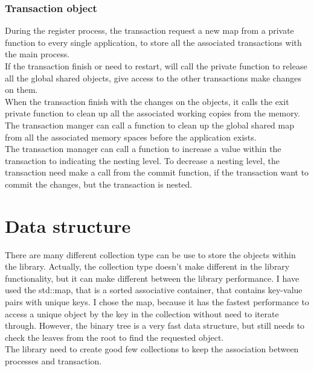 \documentclass[12pt]{article}
\begin{document}
\subsubsection{Transaction object}
During the register process, the transaction request a new map from a private function to every single application, to store all the associated transactions with the main process.\\
If the transaction finish or need to restart, will call the private function to release all the global shared objects, give access to the other transactions make changes on them.\\ 
When the transaction finish with the changes on the objects, it calls the exit private function to clean up all the associated working copies from the memory.\\

The transaction manger can  call a function to clean up the global shared map from all the associated memory spaces before the application exists.\\

The transaction manager can call a function to increase a value within the transaction to indicating the nesting level. To decrease a nesting level, the transaction need make a call from the commit function, if the transaction want to commit the changes, but the transaction is nested.

\section{Data structure}
There are many different collection type can be use to store the objects within the library. Actually, the collection type doesn't make different in the library functionality, but it can make different between the library performance. I have used the std::map, that is a sorted associative container, that contains key-value pairs with unique keys. I chose the map, because it has the fastest performance to access a unique object by the key in the collection without need to iterate through. However, the binary tree is a very fast data structure, but still needs to check the leaves from the root to find the requested object.\\

The library need to create good few collections to keep the association between processes and transaction.
\end{document}
